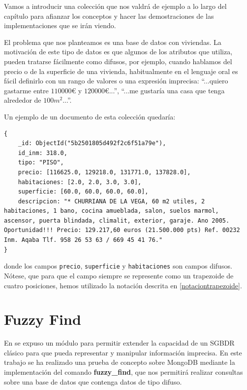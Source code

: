 \begin{example}
Vamos a introducir una colección que nos valdrá de ejemplo a lo largo del capítulo para afianzar los conceptos y hacer las demostraciones de las implementaciones que se irán viendo.

El problema que nos planteamos es una base de datos con viviendas. La motivación de este tipo de datos es que algunos de los atributos que utiliza, pueden tratarse fácilmente como difusos, por ejemplo, cuando hablamos del precio o de la superficie de una vivienda, habitualmente en el lenguaje oral es fácil definirlo con un rango de valores o una expresión imprecisa: ``...quiero gastarme entre $110000$€ y $120000$€...'', ``...me gustaría una casa que tenga alrededor de $100m^2$...''.

Un ejemplo de un documento de esta colección quedaría:

\begin{lstlisting}[numbers=none]
{
    _id: ObjectId("5b2501805d492f2c6f51a79e"),
    id_inm: 318.0,
    tipo: "PISO",
    precio: [116625.0, 129218.0, 131771.0, 137828.0],
    habitaciones: [2.0, 2.0, 3.0, 3.0],
    superficie: [60.0, 60.0, 60.0, 60.0],
    descripcion: "* CHURRIANA DE LA VEGA, 60 m2 utiles, 2 habitaciones, 1 bano, cocina amueblada, salon, suelos marmol, ascensor, puerta blindada, climalit, exterior, garaje. Ano 2005. Oportunidad!!! Precio: 129.217,60 euros (21.500.000 pts) Ref. 00232 Inm. Aqaba Tlf. 958 26 53 63 / 669 45 41 76."
}
\end{lstlisting}

donde los campos \texttt{precio},  \texttt{superficie} y \texttt{habitaciones} son campos difusos. Nótese, que para que el campo siempre se represente como un trapezoide de cuatro posiciones, hemos utilizado la notación descrita en \ref{notaciontrapezoide}.
\end{example}

\section{Fuzzy Find}

En \cite{tesismedina} se expuso un módulo para permitir extender la capacidad de un SGBDR clásico para que pueda representar y manipular información imprecisa. En este trabajo se ha realizado una prueba de concepto sobre MongoDB mediante la implementación del comando \textbf{fuzzy\_find}, que nos permitirá realizar consultas sobre una base de datos que contenga datos de tipo difuso.

